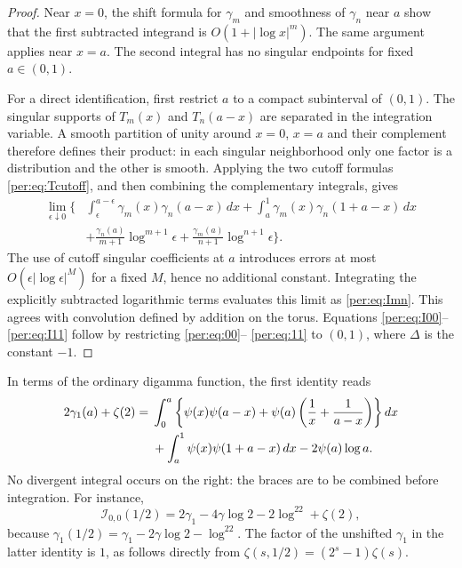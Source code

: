 \begin{proof}
Near $x=0$, the shift formula for $\gamma_m$ and smoothness of
$\gamma_n$ near $a$ show that the first subtracted integrand is
$O(1+|\log x|^m)$. The same argument applies near $x=a$. The second
integral has no singular endpoints for fixed $a\in(0,1)$.

For a direct identification, first restrict $a$ to a compact subinterval
of $(0,1)$. The singular supports of $T_m(x)$ and $T_n(a-x)$ are
separated in the integration variable. A smooth partition of unity
around $x=0$, $x=a$ and their complement therefore defines their
product: in each singular neighborhood only one factor is a
distribution and the other is smooth. Applying the two cutoff formulas
\eqref{per:eq:Tcutoff}, and then combining the complementary integrals,
gives
\begin{align*}
 \lim_{\epsilon\downarrow0}\biggl\{&
 \int_\epsilon^{a-\epsilon}\gamma_m(x)\gamma_n(a-x)\,dx
 +\int_a^1\gamma_m(x)\gamma_n(1+a-x)\,dx\\
 &+\frac{\gamma_n(a)}{m+1}\log^{m+1}\epsilon
  +\frac{\gamma_m(a)}{n+1}\log^{n+1}\epsilon\biggr\}.
\end{align*}
The use of cutoff singular coefficients at $a$ introduces errors at most
$O(\epsilon|\log\epsilon|^M)$ for a fixed $M$, hence no additional
constant. Integrating the explicitly subtracted logarithmic terms
evaluates this limit as \eqref{per:eq:Imn}. This agrees with convolution
defined by addition on the torus. Equations \eqref{per:eq:I00}--
\eqref{per:eq:I11} follow by restricting \eqref{per:eq:00}--
\eqref{per:eq:11} to $(0,1)$, where $\Delta$ is the constant $-1$.
\end{proof}

In terms of the ordinary digamma function, the first identity reads
\begin{align}
 2\gamma_1(a)+\zeta(2)={}&
 \int_0^a\left\{\psi(x)\psi(a-x)
       +\psi(a)\left(\frac1x+\frac1{a-x}\right)\right\}dx\notag\\
 &+\int_a^1\psi(x)\psi(1+a-x)\,dx-2\psi(a)\log a.
 \label{per:eq:digammaintegral}
\end{align}
No divergent integral occurs on the right: the braces are to be combined
before integration. For instance,
\[
 \mathcal I_{0,0}(1/2)
 =2\gamma_1-4\gamma\log2-2\log^22+\zeta(2),
\]
because $\gamma_1(1/2)=\gamma_1-2\gamma\log2-\log^22$.
The factor of the unshifted $\gamma_1$ in the latter identity is $1$,
as follows directly from $\zeta(s,1/2)=(2^s-1)\zeta(s)$.

